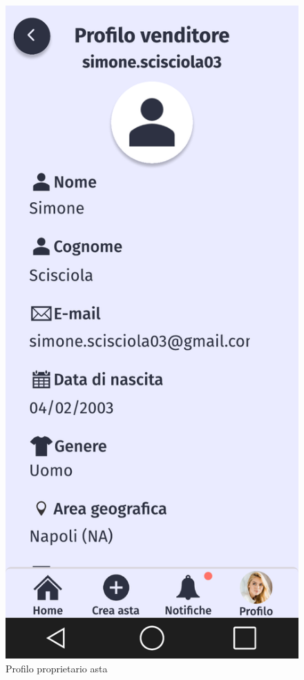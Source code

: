 \begin{figure}[!htb]
\begin{minipage}{0.32\textwidth}
            \includegraphics[width=.7\linewidth]{Immagini/Frames/Compratore/C10.pdf}
            \caption{Profilo proprietario asta}
        \end{minipage}\hfill
        \begin{minipage}{0.32\textwidth}
            \centering

\end{minipage}
\end{figure}
